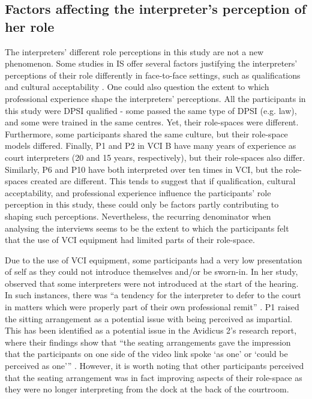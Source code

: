 \documentclass[output=paper]{langsci/langscibook}
\begin{document}
\subsection{Factors affecting the interpreter’s perception of her role}
The interpreters’ different role perceptions in this study are not a new phenomenon. Some studies in IS offer several factors justifying the interpreters’ perceptions of their role differently in face-to-face settings, such as qualifications \citep{Martin2008} and cultural acceptability \citep{Merlini2009}. One could also question the extent to which professional experience shape the interpreters’ perceptions. All the participants in this study were \textsc{DPSI} qualified - some passed the same type of \textsc{DPSI} (e.g. law), and some were trained in the same centres. Yet, their role-spaces were different. Furthermore, some participants shared the same culture, but their role-space models differed. Finally, P1 and P2 in \textsc{VCI} B have many years of experience as court interpreters (20 and 15 years, respectively), but their role-spaces also differ. Similarly, P6 and P10 have both interpreted over ten times in \textsc{VCI}, but the role-spaces created are different. This tends to suggest that if qualification, cultural acceptability, and professional experience influence the participants’ role perception in this study, these could only be factors partly contributing to shaping such perceptions. Nevertheless, the recurring denominator when analysing the interviews seems to be the extent to which the participants felt that the use of \textsc{VCI} equipment had limited parts of their role-space. 

Due to the use of \textsc{VCI} equipment, some participants had a very low presentation of self as they could not introduce themselves and/or be sworn-in. In her study, \citet{Fowler2013} observed that some interpreters were not introduced at the start of the hearing. In such instances, there was “a tendency for the interpreter to defer to the court in matters which were properly part of their own professional remit” \citep[245]{Fowler2013}. P1 raised the sitting arrangement as a potential issue with being perceived as impartial. This has been identified as a potential issue in the Avidicus 2’s research report, where their findings show that “the seating arrangements gave the impression that the participants on one side of the video link spoke ‘as one’ or ‘could be perceived as one’” \citep[53]{Braun2013}. However, it is worth noting that other participants perceived that the seating arrangement was in fact improving aspects of their role-space as they were no longer interpreting from the dock at the back of the courtroom.
\end{document}
